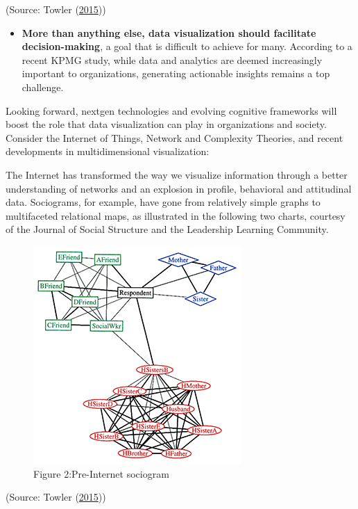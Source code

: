 \documentclass[]{book}
\providecommand{\tightlist}{%
  \setlength{\itemsep}{0pt}\setlength{\parskip}{0pt}}
\theoremstyle{definition}
\theoremstyle{definition}
\theoremstyle{definition}
\theoremstyle{remark}
\begin{document}
(Source: Towler (\protect\hyperlink{ref-future_viz}{2015}))

\begin{itemize}
\tightlist
\item
  \textbf{More than anything else, data visualization should facilitate
  decision-making}, a goal that is difficult to achieve for many.
  According to a recent KPMG study, while data and analytics are deemed
  increasingly important to organizations, generating actionable
  insights remains a top challenge.
\end{itemize}

Looking forward, nextgen technologies and evolving cognitive frameworks
will boost the role that data visualization can play in organizations
and society. Consider the Internet of Things, Network and Complexity
Theories, and recent developments in multidimensional visualization:

The Internet has transformed the way we visualize information through a
better understanding of networks and an explosion in profile, behavioral
and attitudinal data. Sociograms, for example, have gone from relatively
simple graphs to multifaceted relational maps, as illustrated in the
following two charts, courtesy of the Journal of Social Structure and
the Leadership Learning Community.

\begin{figure}
\centering
\includegraphics{images/Pre-internet.jpg}
\caption{Figure 2:Pre-Internet sociogram}
\end{figure}

(Source: Towler (\protect\hyperlink{ref-future_viz}{2015}))
\end{document}
